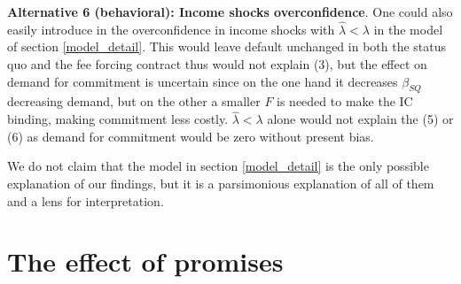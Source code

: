 \documentclass[oneside,11pt]{article}
\begin{document}
\vspace{.1in}
\noindent \textbf{Alternative 6 (behavioral): Income shocks overconfidence}. One could also easily introduce in the overconfidence in income shocks with $\widehat{\lambda} <\lambda$ in the model of section \ref{model_detail}. This would leave default unchanged in both the status quo and the fee forcing contract thus would not explain (3), %
but the effect on demand for commitment is uncertain since on the one hand it decreases $\beta_{SQ}$ decreasing demand, but on the other a smaller $F$ is needed to make the IC binding, making commitment less costly. $\widehat{\lambda} <\lambda$ alone would not explain the (5) or (6) as demand for commitment would be zero without present bias. 

\vspace{.1in}
We do not claim that the model in section \ref{model_detail} is the only possible explanation of our findings, but it is a parsimonious explanation of all of them and a lens for interpretation.


\section{The effect of promises} \label{promises}
\end{document}
